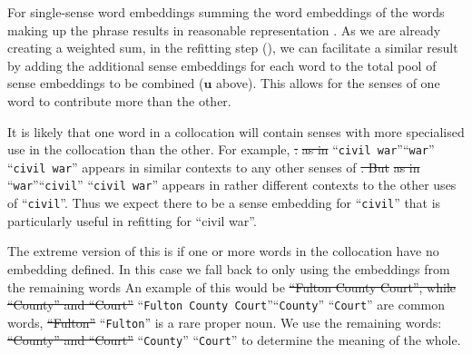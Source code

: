 \documentclass{sig-alternate}
\renewcommand{\u}{\mathbf{u}}
\newcommand{\wordquote}[1]{\enquote{\texttt{#1}}} %
\providecommand{\DIFadd}[1]{{\protect\color{blue}\uwave{#1}}} %
\providecommand{\DIFdel}[1]{{\protect\color{red}\sout{#1}}}                      %
\providecommand{\DIFaddbegin}{} %
\providecommand{\DIFaddend}{} %
\providecommand{\DIFdelbegin}{} %
\providecommand{\DIFdelend}{} %
\begin{document}
For single-sense word embeddings  summing the word embeddings of the words making up the phrase results in reasonable representation \parencite{mikolovSkip, White2015SentVecMeaning}.
As we are already creating a weighted sum, in the refitting step (), we can facilitate a similar result by adding the additional sense embeddings for each word to the total pool of sense embeddings to be combined ($\u$ above). This allows for the senses of one word to contribute more than the other.

It is likely that one word in a collocation will contain senses with more specialised use in the collocation than the other.
For example, \DIFdelbegin %
\DIFdel{: }%
\DIFdel{as in }%
\DIFdelend \DIFaddbegin \wordquote{civil war}\DIFadd{: }\wordquote{war} \DIFadd{as in }\wordquote{civil war} \DIFaddend appears in similar contexts to any other senses of \DIFdelbegin %
\DIFdel{.
But }%
\DIFdel{as in }%
\DIFdelend \DIFaddbegin \wordquote{war}\DIFadd{.
But }\wordquote{civil} \DIFadd{as in }\wordquote{civil war} \DIFaddend appears in rather different contexts to the other uses of \DIFdelbegin %
\DIFdelend \DIFaddbegin \wordquote{civil}\DIFaddend . Thus we expect there to be a sense embedding for \DIFdelbegin %
\DIFdelend \DIFaddbegin \wordquote{civil} \DIFaddend that is particularly useful in refitting for \enquote{civil war}.


The extreme version of this is if one or more words in the collocation have no embedding defined. In this case we fall back to only using the embeddings from the remaining words An example of this would be \DIFdelbegin \DIFdel{``Fulton County Court'', while ``County'' and ``Court'' }\DIFdelend \DIFaddbegin \wordquote{Fulton County Court}\DIFadd{, while }\wordquote{County} \DIFadd{and }\wordquote{Court} \DIFaddend are common words, \DIFdelbegin \DIFdel{``Fulton'' }\DIFdelend \DIFaddbegin \wordquote{Fulton} \DIFaddend is a rare proper noun. We use the remaining words: \DIFdelbegin \DIFdel{``County'' and ``Court'' }\DIFdelend \DIFaddbegin \wordquote{County} \DIFadd{and }\wordquote{Court} \DIFaddend to determine the meaning of the whole.
\end{document}
